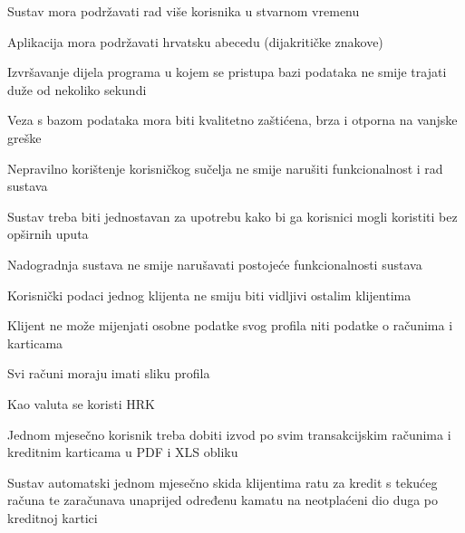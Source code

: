 			 \begin{packed_item}
			 	\item Sustav mora podržavati rad više korisnika u stvarnom vremenu
			 	\item Aplikacija mora podržavati hrvatsku abecedu (dijakritičke znakove)
			 	\item Izvršavanje dijela programa u kojem se pristupa bazi podataka ne smije trajati duže od nekoliko sekundi 
			 	\item Veza s bazom podataka mora biti kvalitetno zaštićena, brza i otporna na vanjske greške
			 	\item Nepravilno korištenje korisničkog sučelja ne smije narušiti funkcionalnost i rad sustava	
			 	\item Sustav treba biti jednostavan za upotrebu kako bi ga korisnici mogli koristiti bez opširnih uputa
			 	\item Nadogradnja sustava ne smije narušavati postojeće funkcionalnosti sustava
			 	\item Korisnički podaci jednog klijenta ne smiju biti vidljivi ostalim klijentima
			 	\item Klijent ne može mijenjati osobne podatke svog profila niti podatke o računima i karticama
			 	\item Svi računi moraju imati sliku profila
			 	\item Kao valuta se koristi HRK
			 	\item Jednom mjesečno korisnik treba dobiti izvod po svim transakcijskim
			 	računima i kreditnim karticama u PDF i XLS obliku
			 	\item Sustav automatski jednom mjesečno skida klijentima ratu za kredit s tekućeg računa te zaračunava unaprijed određenu kamatu na neotplaćeni dio duga po kreditnoj kartici
			 \end{packed_item}
